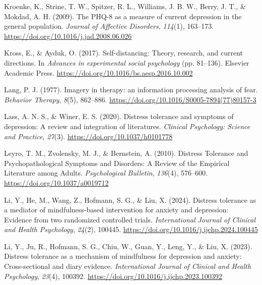 \documentclass[
  man,floatsintext]{apa7}
\newlength{\cslhangindent}
\newlength{\cslentryspacingunit} %
\newenvironment{CSLReferences}[2] %
 {%
  \setlength{\parindent}{0pt}
  \ifodd #1
  \let\oldpar\par
  \def\par{\hangindent=\cslhangindent\oldpar}
  \fi
  \setlength{\parskip}{#2\cslentryspacingunit}
 }%
 {}
\begin{document}
\begin{CSLReferences}{1}{0}
\leavevmode{}%
Kroenke, K., Strine, T. W., Spitzer, R. L., Williams, J. B. W., Berry, J. T., \& Mokdad, A. H. (2009). The PHQ-8 as a measure of current depression in the general population. \emph{Journal of Affective Disorders}, \emph{114}(1), 163--173. \url{https://doi.org/10.1016/j.jad.2008.06.026}

\leavevmode{}%
Kross, E., \& Ayduk, O. (2017). Self-distancing: Theory, research, and current directions. In \emph{Advances in experimental social psychology} (pp. 81--136). Elsevier Academic Press. \url{https://doi.org/10.1016/bs.aesp.2016.10.002}

\leavevmode{}%
Lang, P. J. (1977). Imagery in therapy: an information processing analysis of fear. \emph{Behavior Therapy}, \emph{8}(5), 862--886. \url{https://doi.org/10.1016/S0005-7894(77)80157-3}

\leavevmode{}%
Lass, A. N. S., \& Winer, E. S. (2020). Distress tolerance and symptoms of depression: A review and integration of literatures. \emph{Clinical Psychology: Science and Practice}, \emph{27}(3). \url{https://doi.org/10.1037/h0101778}

\leavevmode{}%
Leyro, T. M., Zvolensky, M. J., \& Bernstein, A. (2010). Distress Tolerance and Psychopathological Symptoms and Disorders: A Review of the Empirical Literature among Adults. \emph{Psychological Bulletin}, \emph{136}(4), 576--600. \url{https://doi.org/10.1037/a0019712}

\leavevmode{}%
Li, Y., He, M., Wang, Z., Hofmann, S. G., \& Liu, X. (2024). Distress tolerance as a mediator of mindfulness-based intervention for anxiety and depression: Evidence from two randomized controlled trials. \emph{International Journal of Clinical and Health Psychology}, \emph{24}(2), 100445. \url{https://doi.org/10.1016/j.ijchp.2024.100445}

\leavevmode{}%
Li, Y., Ju, R., Hofmann, S. G., Chiu, W., Guan, Y., Leng, Y., \& Liu, X. (2023). Distress tolerance as a mechanism of mindfulness for depression and anxiety: Cross-sectional and diary evidence. \emph{International Journal of Clinical and Health Psychology}, \emph{23}(4), 100392. \url{https://doi.org/10.1016/j.ijchp.2023.100392}


\end{CSLReferences}
\end{document}
